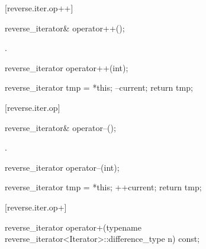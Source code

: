 [reverse.iter.op++]{}

%
\begin{itemdecl}
reverse_iterator& operator++();
\end{itemdecl}

\begin{itemdescr}
\pnum
\effects
{}

\pnum
\returns
{}.
\end{itemdescr}

%
%
\begin{itemdecl}
reverse_iterator operator++(int);
\end{itemdecl}

\begin{itemdescr}
\pnum
\effects
\begin{codeblock}
reverse_iterator tmp = *this;
--current;
return tmp;
\end{codeblock}
\end{itemdescr}

[reverse.iter.op\dcr]{}

%
\begin{itemdecl}
reverse_iterator& operator--();
\end{itemdecl}

\begin{itemdescr}
\pnum
\effects
{}

\pnum
\returns
{}.
\end{itemdescr}

%
%
\begin{itemdecl}
reverse_iterator operator--(int);
\end{itemdecl}

\begin{itemdescr}
\pnum
\effects
\begin{codeblock}
reverse_iterator tmp = *this;
++current;
return tmp;
\end{codeblock}
\end{itemdescr}

[reverse.iter.op+]{}

%
\begin{itemdecl}
reverse_iterator
operator+(typename reverse_iterator<Iterator>::difference_type n) const;
\end{itemdecl}

